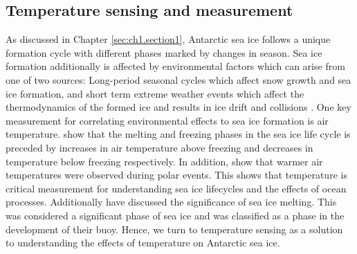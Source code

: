 \subsection{Temperature sensing and measurement}

As discussed in Chapter \ref{sec:ch1.section1}, Antarctic sea ice follows a unique formation cycle with different phases marked by changes in season. Sea ice formation additionally is affected by environmental factors which can arise from one of two sources: Long-period seasonal cycles \cite{barber2005microwave} which affect snow growth and sea ice formation, and short term extreme weather events \cite{vichi2019effects,albarello2020drift} which affect the thermodynamics of the formed ice and results in ice drift and collisions \cite{arrigo2004large}. One key measurement for correlating environmental effects to sea ice formation is air temperature. \textcite{barber2005microwave} show that  the melting and freezing phases in the sea ice life cycle is preceded by increases in air temperature above freezing and decreases in temperature below freezing respectively. In addition, \textcite{vichi2019effects} show that warmer air temperatures were observed during polar events. This shows that temperature is critical measurement for understanding sea ice lifecycles and the effects of ocean processes. Additionally \textcite{kohout2015device,doble2017robust,doble2017robust} have discussed the significance of sea ice melting. This was considered a significant phase of sea ice and was classified as a phase in the development of their buoy. Hence, we turn to temperature sensing as a solution to understanding the effects of temperature on Antarctic sea ice.\par 

